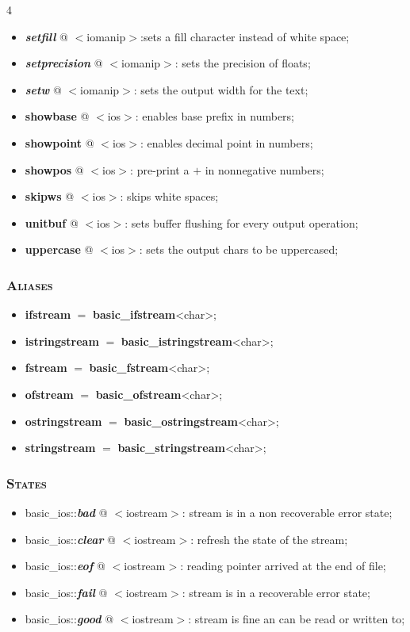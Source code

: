 \documentclass[10pt]{article}
\begin{document}
\begin{multicols*}{4}
{\begin{itemize}[leftmargin=*,topsep=0.25pt]
	\item \emph{\textbf{setfill}} @ $<$iomanip$>$:sets a fill character instead of white space; 
	\item \emph{\textbf{setprecision}} @ $<$iomanip$>$: sets the precision of floats; 
	\item \emph{\textbf{setw}} @ $<$iomanip$>$: sets the output width for the text; 
	\item \textbf{showbase} @ $<$ios$>$: enables base prefix in numbers;
	\item \textbf{showpoint} @ $<$ios$>$: enables decimal point in numbers;
	\item \textbf{showpos} @ $<$ios$>$: pre-print a $+$ in nonnegative numbers;
	\item \textbf{skipws} @ $<$ios$>$: skips white spaces;
	\item \textbf{unitbuf} @ $<$ios$>$: sets buffer flushing for every output operation;
	\item \textbf{uppercase} @ $<$ios$>$: sets the output chars to be uppercased;
\end{itemize}

\subsubsection*{\textsc{Aliases}} 
\begin{itemize}[leftmargin=*,topsep=0.25pt]
  \setlength\itemsep{-1.8pt}
	\item \textbf{ifstream} $=$ \textbf{basic\_ifstream}<char>;
	\item \textbf{istringstream} $=$ \textbf{basic\_istringstream}<char>;
	\item \textbf{fstream} $=$ \textbf{basic\_fstream}<char>;
	\item \textbf{ofstream} $=$ \textbf{basic\_ofstream}<char>;
	\item \textbf{ostringstream} $=$ \textbf{ba\-sic\_o\-string\-stream}\-<char>;
	\item \textbf{stringstream} $=$ \textbf{basic\_stringstream}<char>;
\end{itemize}


\subsubsection*{\textsc{States}} 
\begin{itemize}[leftmargin=*,topsep=0.25pt]
  \setlength\itemsep{-1.8pt}
	\item basic\_ios::\emph{\textbf{bad}} @ $<$iostream$>$: stream is in a non recoverable error state;
	\item basic\_ios::\emph{\textbf{clear}} @ $<$iostream$>$: refresh the state of the stream;
	\item basic\_ios::\emph{\textbf{eof}} @ $<$iostream$>$: reading pointer arrived at the end of file;
	\item basic\_ios::\emph{\textbf{fail}} @ $<$iostream$>$: stream is in a recoverable error state;
	\item basic\_ios::\emph{\textbf{good}} @ $<$iostream$>$: stream is fine an can be read or written to;
\end{itemize}


}
\end{multicols*}
\end{document}
